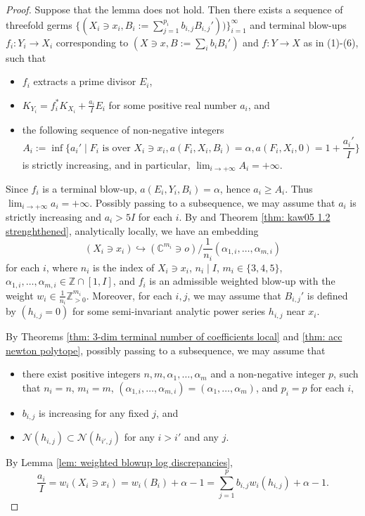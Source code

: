 \documentclass[11pt]{amsart}
\numberwithin{equation}{section}
\newcommand{\Zz}{\mathbb{Z}}
\theoremstyle{definition}
\theoremstyle{definition}
\begin{document}
\begin{proof}

Suppose that the lemma does not hold. Then there exists a sequence of threefold germs $\{(X_i\ni x_i, B_i:=\sum_{j=1}^{p_i} b_{i,j}B_{i,j}'))\}_{i=1}^{\infty}$ and terminal blow-ups $f_i: Y_i\rightarrow X_i$ corresponding to $(X\ni x,B:=\sum_{i} b_iB_i')$ and $f:Y\to X$ as in (1)-(6), such that
\begin{itemize}
\item $f_i$ extracts a prime divisor $E_i$,
\item $K_{Y_i}=f_i^*K_{X_i}+\frac{a_i}{I}E_i$ for some positive real number $a_i$, and
\item the following sequence of non-negative integers$$A_i:=\inf\{a_i'\mid F_i\text{ is over }X_i\ni x_i, a(F_i,X_i,B_i)=\alpha, a(F_i,X_i,0)=1+\frac{a_i'}{I}\}$$
    is strictly increasing, and in particular, $\lim_{i\rightarrow+\infty}A_i=+\infty$.
\end{itemize}
Since $f_i$ is a terminal blow-up, $a(E_i,Y_i,B_i)=\alpha$, hence $a_i\geq A_i$. Thus $\lim_{i\rightarrow+\infty}a_i=+\infty$. Possibly passing to a subsequence, we may assume that $a_i$ is strictly increasing and $a_i>5I$ for each $i$. By \cite[Theorem~1.1]{Kaw01} and Theorem \ref{thm: kaw05 1.2 strenghthened}, analytically locally, we have an embedding $$(X_i\ni x_i)\hookrightarrow (\mathbb{C}^{m_i}\ni o)/\frac{1}{n_i}(\alpha_{1,i},\dots,\alpha_{m,i})$$ for each $i$, where $n_i$ is the index of $X_i\ni x_i$, $n_i\mid I$, $m_i\in \{3,4,5\}$, $\alpha_{1,i},\dots,\alpha_{m,i}\in \Zz\cap[1,I]$, and $f_i$ is an admissible weighted blow-up with the weight $w_i\in \frac{1}{n_i}\Zz_{>0}^{m_i}$. Moreover, for each $i,j$, we may assume that $B_{i,j}'$ is defined by $(h_{i,j}=0)$ for some semi-invariant analytic power series $h_{i,j}$ near $x_i$. 

By Theorems \ref{thm: 3-dim terminal number of coefficients local} and \ref{thm: acc newton polytope}, possibly passing to a subsequence, we may assume that
\begin{itemize}
    \item there exist positive integers $n,m,\alpha_1,\dots,\alpha_m$ and a non-negative integer $p$, such that $n_i=n$, $m_i=m$, $(\alpha_{1,i},\dots,\alpha_{m,i})=(\alpha_1,\dots,\alpha_m)$, and $p_i=p$ for each $i$, 
    \item $b_{i,j}$ is increasing for any fixed $j$, and
    \item $\mathcal{N}(h_{i,j})\subset \mathcal{N}(h_{i',j})$ for any $i>i'$ and any $j$.
\end{itemize}
By Lemma \ref{lem: weighted blowup log discrepancies},
$$\frac{a_i}{I}=w_i(X_i\ni x_i)=w_i(B_i)+\alpha-1=\sum_{j=1}^{p} b_{i,j}w_i(h_{i,j})+\alpha-1.$$


\end{proof}
\end{document}
